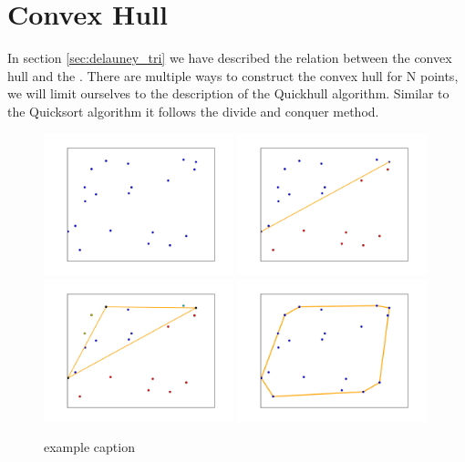 \section{Convex Hull}

In section \ref{sec:delauney_tri} we have described the relation between the convex hull  and the \deltri. There are multiple ways to construct the convex hull for N points, we will limit ourselves to the description of the Quickhull algorithm. Similar to the Quicksort algorithm it follows the divide and conquer method. 


\begin{figure}[htbp] %
   \centering
   \includegraphics[width=0.49\textwidth]{chapter7/plots/qhull_1.pdf} 
   \includegraphics[width=0.49\textwidth]{chapter7/plots/qhull_2.pdf} 
   \includegraphics[width=0.49\textwidth]{chapter7/plots/qhull_3.pdf} 
   \includegraphics[width=0.49\textwidth]{chapter7/plots/qhull_final.pdf} 
   \caption{example caption}
   \label{fig:example}
\end{figure}

